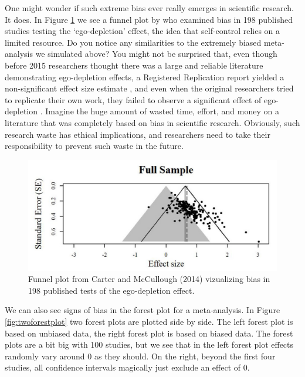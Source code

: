 \documentclass[
  oneside]{book}
\begin{document}
One might wonder if such extreme bias ever really emerges in scientific research. It does. In Figure \ref{fig:carterbias} we see a funnel plot by \citet{carter_publication_2014} who examined bias in 198 published studies testing the `ego-depletion' effect, the idea that self-control relies on a limited resource. Do you notice any similarities to the extremely biased meta-analysis we simulated above? You might not be surprised that, even though before 2015 researchers thought there was a large and reliable literature demonstrating ego-depletion effects, a Registered Replication report yielded a non-significant effect size estimate \citep{hagger_multilab_2016}, and even when the original researchers tried to replicate their own work, they failed to observe a significant effect of ego-depletion \citep{vohs_multisite_2021}. Imagine the huge amount of wasted time, effort, and money on a literature that was completely based on bias in scientific research. Obviously, such research waste has ethical implications, and researchers need to take their responsibility to prevent such waste in the future.

\begin{figure}

{\centering \includegraphics[width=1\linewidth]{images/carterfunnel} 

}

\caption{Funnel plot from Carter and McCullough (2014) vizualizing bias in 198 published tests of the ego-depletion effect.}\label{fig:carterbias}
\end{figure}

We can also see signs of bias in the forest plot for a meta-analysis. In Figure \ref{fig:twoforestplot} two forest plots are plotted side by side. The left forest plot is based on unbiased data, the right forest plot is based on biased data. The forest plots are a bit big with 100 studies, but we see that in the left forest plot effects randomly vary around 0 as they should. On the right, beyond the first four studies, all confidence intervals magically just exclude an effect of 0.
\end{document}
